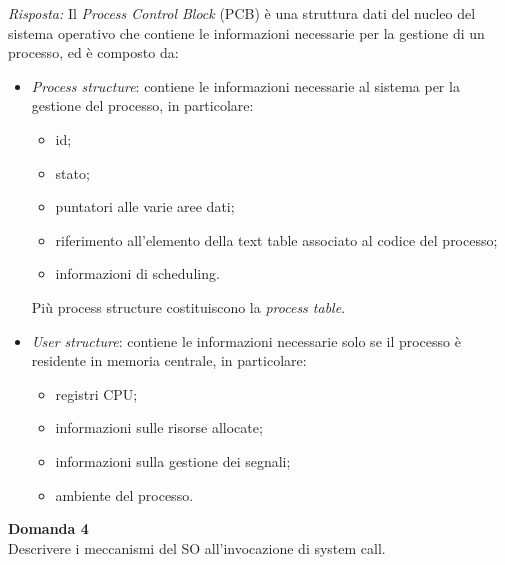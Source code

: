 \documentclass{article}
\newenvironment{problem}[2][Domanda]
    { \begin{mdframed}[backgroundcolor=gray!20] \textbf{#1 #2} \\}
    {  \end{mdframed}}
\newenvironment{solution}
    {\textit{Risposta:}}
    {}
\begin{document}
\begin{solution}
\newline
\newline
Il \textit{Process Control Block} (PCB) è una struttura dati del nucleo del sistema operativo che contiene le informazioni necessarie per la gestione di un processo, ed è composto da:
\begin{itemize}
    \item \emph{Process structure}: contiene le informazioni necessarie al sistema per la gestione del processo, in particolare:
    \begin{itemize}
        \item id;
        \item stato;
        \item puntatori alle varie aree dati;
        \item riferimento all'elemento della text table associato al codice del processo;
        \item informazioni di scheduling.
    \end{itemize} 
    Più process structure costituiscono la \textit{process table}. 
    \item \emph{User structure}: contiene le informazioni necessarie solo se il processo è residente in memoria centrale, in particolare:
    \begin{itemize}
        \item registri CPU;
        \item informazioni sulle risorse allocate;
        \item informazioni sulla gestione dei segnali;
        \item ambiente del processo.
    \end{itemize}
\end{itemize}
\end{solution}
\begin{problem}{4}
Descrivere i meccanismi del SO all’invocazione di system call.
\end{problem}
\end{document}
